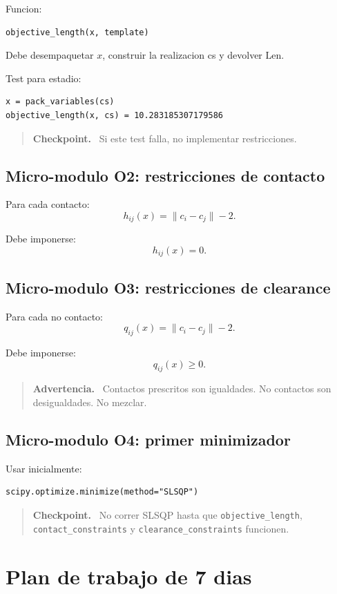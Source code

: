 \documentclass[11pt,letterpaper]{amsart}
\newcommand{\Len}{\mathrm{Len}}
\newenvironment{checkpoint}
{\par\medskip\noindent\begin{quote}\textbf{Checkpoint.}\ }
{\end{quote}\par\medskip}
\newenvironment{warningbox}
{\par\medskip\noindent\begin{quote}\textbf{Advertencia.}\ }
{\end{quote}\par\medskip}
\begin{document}
Funcion:
\begin{verbatim}
objective_length(x, template)
\end{verbatim}

Debe desempaquetar \(x\), construir la realizacion cs y devolver \(\Len\).

Test para estadio:
\begin{verbatim}
x = pack_variables(cs)
objective_length(x, cs) = 10.283185307179586
\end{verbatim}

\begin{checkpoint}
Si este test falla, no implementar restricciones.
\end{checkpoint}

\subsection{Micro-modulo O2: restricciones de contacto}

Para cada contacto:
\[
h_{ij}(x)=\|c_i-c_j\|-2.
\]

Debe imponerse:
\[
h_{ij}(x)=0.
\]

\subsection{Micro-modulo O3: restricciones de clearance}

Para cada no contacto:
\[
q_{ij}(x)=\|c_i-c_j\|-2.
\]

Debe imponerse:
\[
q_{ij}(x)\geq0.
\]

\begin{warningbox}
Contactos prescritos son igualdades. No contactos son desigualdades. No mezclar.
\end{warningbox}

\subsection{Micro-modulo O4: primer minimizador}

Usar inicialmente:
\begin{verbatim}
scipy.optimize.minimize(method="SLSQP")
\end{verbatim}

\begin{checkpoint}
No correr SLSQP hasta que \texttt{objective\_length},
\texttt{contact\_constraints} y \texttt{clearance\_constraints} funcionen.
\end{checkpoint}

\section{Plan de trabajo de 7 dias}
\end{document}
